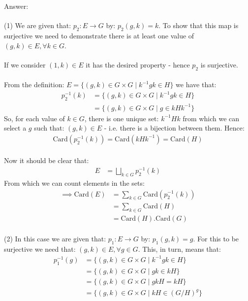 \documentclass[12pt,a4paper]{article}
\begin{document}
\vspace{1cm}
\noindent
Answer:\\
\\
(1) We are given that: $p_2: E \to G$ by: $p_2(g,k) = k$.  To show that this map is surjective we need
to demonstrate there is at least one value of $(g,k) \in E, \forall k \in G$.\\
\\
If we consider $(1, k) \in E$ it has the desired property - hence $p_2$ is surjective.\\
\\
From the definition: $E=\{(g,k)\in G \times G \mid k^{-1}gk\in H\}$ we have that:
\begin{align*}
    p_2^{-1}(k) &= \{(g,k)\in G \times G \mid k^{-1}gk\in H\} \\
    &= \{(g,k)\in G \times G \mid g \in kHk^{-1}\}
\end{align*}
So, for each value of $k \in G$, there is one unique set: $k^{-1}Hk$ from which we can select a $g$ such that: $(g,k) \in E$ - i.e. there is a bijection between them.
Hence:
\begin{align*}
    \text{Card}(p_2^{-1}(k)) = \text{Card}(kHk^{-1}) = \text{Card}(H) \tag{B.1}
\end{align*} 
\\
Now it should be clear that:
\begin{align*}
    E &= \bigsqcup_{k \in G} p_2^{-1}(k)
\end{align*}
From which we can count elements in the sets:
\begin{align*}
    \implies  \text{Card}(E) &= \sum_{k \in G} \text{Card}(p_2^{-1}(k)) \\
    &= \sum_{k \in G} \text{Card}(H) \\
    &= \text{Card}(H) . \text{Card}(G) \tag{EQN-1}
\end{align*}
\\
(2) In this case we are given that: $p_1: E \to G$ by: $p_1(g,k) = g$.  For this to be surjective we need that: $(g,k) \in E, \forall g \in G$.  This, in turn, means that:
\begin{align*}
    p_1^{-1}(g) &= \{(g,k) \in G \times G \mid k^{-1}gk \in H \} \\
    &= \{(g,k) \in G \times G \mid g k \in k H \} \\
    &= \{(g,k) \in G \times G \mid g k H = k H \} \tag{B.2.1}\\
    &= \{(g,k) \in G \times G \mid kH \in (G/H)^g \} \tag{B.2.2}
\end{align*}
\end{document}

